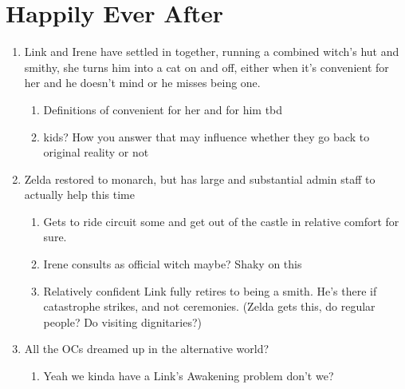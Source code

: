 \documentclass[../FGP.tex]{subfiles}
\begin{document}
\section{Happily Ever After}
\begin{enumerate}
   \item  Link and Irene have settled in together, running a combined witch's hut and smithy, she turns him into a cat on and off, either when it's convenient for her and he doesn't mind or he misses being one. \begin{enumerate} \item Definitions of convenient for her and for him tbd \item kids? How you answer that may influence whether they go back to original reality or not\end{enumerate}
   \item Zelda restored to monarch, but has large and substantial admin staff to actually help this time\begin{enumerate} \item Gets to ride circuit some and get out of the castle in relative comfort for sure. \item Irene consults as official witch maybe? Shaky on this \item Relatively confident Link fully retires to being a smith. He's there if catastrophe strikes, and not ceremonies. (Zelda gets this, do regular people? Do visiting dignitaries?)\end{enumerate}
   \item All the OCs dreamed up in the alternative world?\begin{enumerate} \item Yeah we kinda have a Link's Awakening problem don't we? \end{enumerate} 
\end{enumerate}
\end{document}
